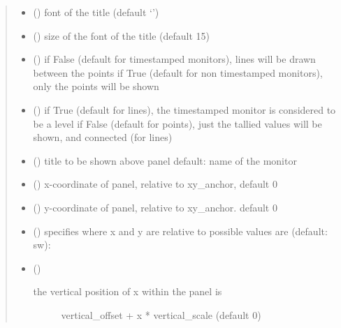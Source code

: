 \documentclass[letterpaper,10pt,english]{sphinxmanual}
\begin{document}
\begin{fulllineitems}
\begin{quote}
\begin{description}
\begin{itemize}
\item {} 
 ({\hyperref[\detokenize{Reference:salabim.Animate.font}]{}}) \textendash{} font of the title (default ‘’)

\item {} 
 () \textendash{} size of the font of the title (default 15)

\item {} 
 () \textendash{} if False (default for timestamped monitors), lines will be drawn between the points 
if True (default for non timestamped monitors),  only the points will be shown

\item {} 
 () \textendash{} if True (default for lines), the timestamped monitor is considered to be a level
if False (default for points), just the tallied values will be shown, and connected (for lines)

\item {} 
 () \textendash{} title to be shown above panel 
default: name of the monitor

\item {} 
 () \textendash{} x-coordinate of panel, relative to xy\_anchor, default 0

\item {} 
 () \textendash{} y-coordinate of panel, relative to xy\_anchor. default 0

\item {} 
 () \textendash{} specifies where x and y are relative to 
possible values are (default: sw): 

\item {} 
 () \textendash{} \begin{description}
\item[{the vertical position of x within the panel is}] \leavevmode
vertical\_offset + x * vertical\_scale (default 0)


\end{description}
\end{itemize}
\end{description}
\end{quote}
\end{fulllineitems}
\end{document}
